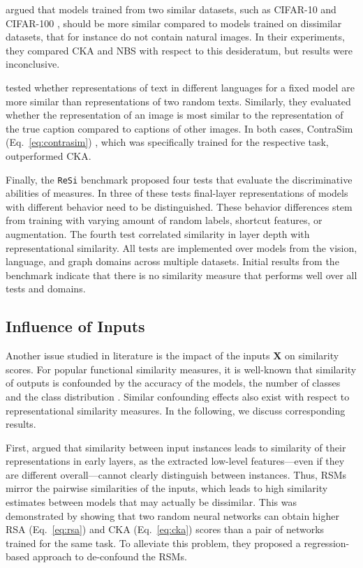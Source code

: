 \documentclass{article}
\newcommand{\citet}{\textcite}
\newcommand\myeqref[1]{%
    (\textup{Eq.~\ref{#1}})%
}
\begin{document}
\begin{refsegment}
\citet{tang_similarity_2020} argued that models trained from two similar datasets, such as CIFAR-10 and CIFAR-100 \cite{krizhevsky_learning_2009}, should be more similar compared to models trained on dissimilar datasets, that for instance do not contain natural images.
In their experiments, they compared CKA and NBS with respect to this desideratum, but results were inconclusive.

\hypertarget{test:contrasim}{}
\citet{rahamim_contrasim_2024} tested whether representations of text in different languages for a fixed model are more similar than representations of two random texts.
Similarly, they evaluated whether the representation of an image is most similar to the representation of the true caption compared to captions of other images.
In both cases, ContraSim \myeqref{eq:contrasim}, which was specifically trained for the respective task, outperformed CKA.

\hypertarget{test:resi_design}{}
Finally, the \texttt{ReSi} benchmark \cite{resi_benchmark_2024} proposed four tests that evaluate the discriminative abilities of measures.
In three of these tests final-layer representations of models with different behavior need to be distinguished.
These behavior differences stem from training with varying amount of random labels, shortcut features, or augmentation.
The fourth test correlated similarity in layer depth with representational similarity.
All tests are implemented over models from the vision, language, and graph domains across multiple datasets.
Initial results from the benchmark indicate that there is no similarity measure that performs well over all tests and domains.


\subsection{Influence of Inputs}\label{sec:input_confounding}

Another issue studied in literature is the impact of the inputs $\bm{X}$ on similarity scores.
For popular functional similarity measures, it is well-known that similarity of outputs is confounded by the accuracy of the models, the number of classes and the class distribution \cite{fort_deep_2020,klabunde_prediction_2023,bhojanapalli_reproducibility_2021,byrt_bias_1993,bakeman_detecting_1997}.
Similar confounding effects also exist with respect to representational similarity measures. In the following, we discuss corresponding results.

First, \citet{cui_deconfounded_2022} argued that similarity between input instances leads to similarity of their representations in early layers, as the extracted low-level features---even if they are different overall---cannot clearly distinguish between instances. Thus, RSMs mirror the pairwise similarities of the inputs, which leads to high similarity estimates between models that may actually be dissimilar.
This was demonstrated by showing that two random neural networks can obtain higher RSA \myeqref{eq:rsa} and CKA \myeqref{eq:cka} scores than a pair of networks trained for the same task.
To alleviate this problem, they proposed a regression-based approach to de-confound the RSMs.


\end{refsegment}
\end{document}
